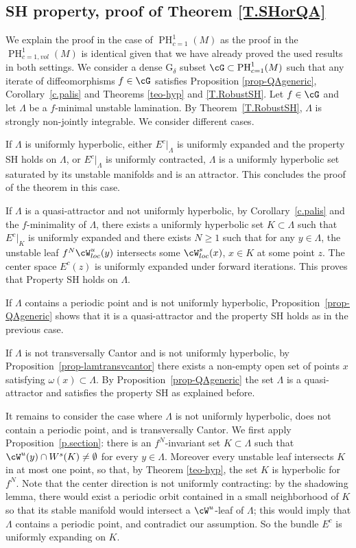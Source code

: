 \documentclass[a4paper,11pt]{amsart}
\numberwithin{equation}{section}     %
\theoremstyle{definition}
\theoremstyle{remark}
\DeclareMathOperator{\PH}{PH}
\begin{document}
\subsection{SH property, proof of Theorem \ref{T.SHorQA}} 
We explain the proof in the case of $\PH^1_{c=1}(M)$ as the proof in the $\PH^1_{c=1,vol}(M)$ is identical given that we have already proved the used results in both settings. 
We consider a dense G$_\delta$ subset $\cG\subset \PH^1_{c=1}(M)$ such that any iterate of diffeomorphisms $f\in \cG$ satisfies Proposition \ref{prop-QAgeneric}, Corollary~\ref{c.palis} and Theorems \ref{teo-hyp} and \ref{T.RobustSH}. Let $f \in \cG$ and let $\Lambda$ be a $f$-minimal unstable lamination. By Theorem~\ref{T.RobustSH}, $\Lambda$ is strongly non-jointly integrable.
We consider different cases.
\smallskip

If $\Lambda$ is uniformly hyperbolic, either $E^c|_\Lambda$ is uniformly expanded and the property SH holds on $\Lambda$, or $E^c|_\Lambda$ is uniformly contracted, $\Lambda$ is a uniformly hyperbolic set saturated by its unstable manifolds and is an attractor. This concludes the proof of the theorem in this case.

If $\Lambda$ is a quasi-attractor and not uniformly hyperbolic, by Corollary~\ref{c.palis} and the $f$-minimality of $\Lambda$, there exists a uniformly hyperbolic set $K\subset \Lambda$ such that $E^c|_K$ is uniformly expanded and there exists $N\geq 1$ such that for any $y\in \Lambda$, the unstable leaf $f^N\cW^u_{loc}(y)$ intersects some $\cW^s_{loc}(x)$, $x\in K$ at some point $z$.
The center space $E^c(z)$ is uniformly expanded under forward iterations. This proves that Property SH holds on $\Lambda$.

If $\Lambda$ contains a periodic point and is not uniformly hyperbolic, Proposition~\ref{prop-QAgeneric} shows that it is a quasi-attractor and the property SH holds as in the previous case.

If $\Lambda$ is not transversally Cantor and is not uniformly hyperbolic, by Proposition~\ref{prop-lamtransvcantor} there exists a non-empty open set of points $x$ satisfying $\omega(x)\subset \Lambda$. By Proposition~\ref{prop-QAgeneric} the set $\Lambda$ is a quasi-attractor and satisfies the property SH as explained before.
\smallskip

It remains to consider the case where $\Lambda$ is not uniformly hyperbolic, does not contain a periodic point, and is transversally Cantor. We first apply Proposition~\ref{p.section}: there is an $f^N$-invariant set $K \subset \Lambda$ such that $\cW^u(y) \cap W^s(K) \neq \emptyset$ for every $y \in \Lambda$. Moreover every unstable leaf intersects $K$ in at most one point, so that, by Theorem \ref{teo-hyp}, the set $K$ is hyperbolic for $f^N$. Note that the center direction is not uniformly contracting: by the shadowing lemma, there would exist a periodic orbit contained in a small neighborhood of $K$ so that its stable manifold would intersect a $\cW^u$-leaf of $\Lambda$; this would imply that $\Lambda$ contains a periodic point, 
and contradict our assumption. So the bundle $E^c$ is uniformly expanding on $K$. 
\end{document}
